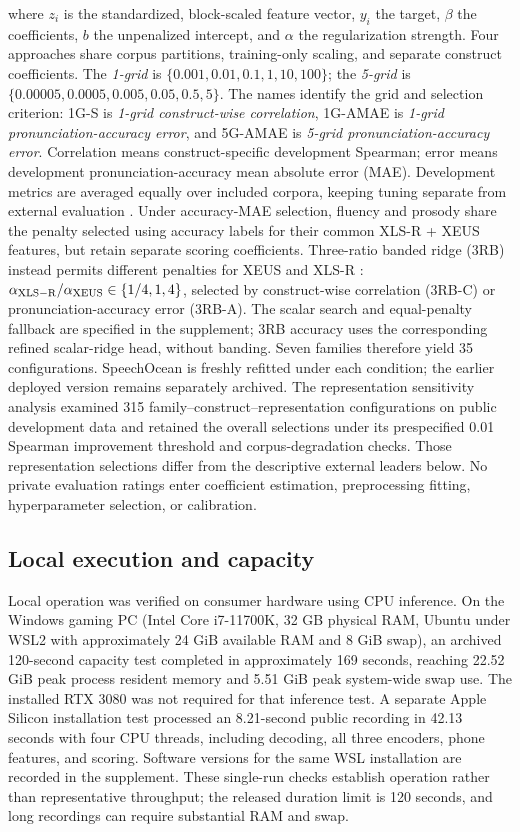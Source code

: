 \documentclass[cameraready]{Interspeech}
\begin{document}
where $z_i$ is the standardized, block-scaled feature vector, $y_i$ the target, $\beta$ the coefficients, $b$ the unpenalized intercept, and $\alpha$ the regularization strength. Four approaches share corpus partitions, training-only scaling, and separate construct coefficients. The \emph{1-grid} is $\{0.001,0.01,0.1,1,10,100\}$; the \emph{5-grid} is $\{0.00005,0.0005,0.005,0.05,0.5,5\}$. The names identify the grid and selection criterion: 1G-S is \emph{1-grid construct-wise correlation}, 1G-AMAE is \emph{1-grid pronunciation-accuracy error}, and 5G-AMAE is \emph{5-grid pronunciation-accuracy error}. Correlation means construct-specific development Spearman; error means development pronunciation-accuracy mean absolute error (MAE). Development metrics are averaged equally over included corpora, keeping tuning separate from external evaluation \cite{cawley}. Under accuracy-MAE selection, fluency and prosody share the penalty selected using accuracy labels for their common XLS-R + XEUS features, but retain separate scoring coefficients. Three-ratio banded ridge (3RB) instead permits different penalties for XEUS and XLS-R \cite{banded}: $\alpha_{\rm XLS-R}/\alpha_{\rm XEUS}\in\{1/4,1,4\}$, selected by construct-wise correlation (3RB-C) or pronunciation-accuracy error (3RB-A). The scalar search and equal-penalty fallback are specified in the supplement; 3RB accuracy uses the corresponding refined scalar-ridge head, without banding. Seven families therefore yield 35 configurations. SpeechOcean is freshly refitted under each condition; the earlier deployed version remains separately archived. The representation sensitivity analysis examined 315 family--construct--representation configurations on public development data and retained the overall selections under its prespecified 0.01 Spearman improvement threshold and corpus-degradation checks. Those representation selections differ from the descriptive external leaders below. No private evaluation ratings enter coefficient estimation, preprocessing fitting, hyperparameter selection, or calibration.



\subsection{Local execution and capacity}
Local operation was verified on consumer hardware using CPU inference. On the Windows gaming PC (Intel Core i7-11700K, 32 GB physical RAM, Ubuntu under WSL2 with approximately 24 GiB available RAM and 8 GiB swap), an archived 120-second capacity test completed in approximately 169 seconds, reaching 22.52 GiB peak process resident memory and 5.51 GiB peak system-wide swap use. The installed RTX 3080 was not required for that inference test. A separate Apple Silicon installation test processed an 8.21-second public recording in 42.13 seconds with four CPU threads, including decoding, all three encoders, phone features, and scoring. Software versions for the same WSL installation are recorded in the supplement. These single-run checks establish operation rather than representative throughput; the released duration limit is 120 seconds, and long recordings can require substantial RAM and swap.
\end{document}
